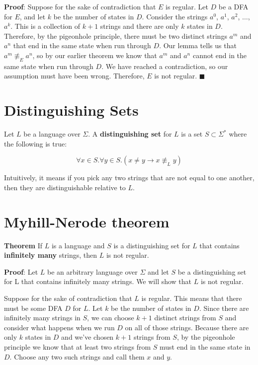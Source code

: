 \documentclass[12pt, letterpaper, oneside]{book}
\begin{document}
\textbf{Proof}: Suppose for the sake of contradiction that $E$ is regular. Let $D$ be a DFA for $E$, and let $k$ be the
number of states in $D$. Consider the strings $a^0$, $a^1$, $a^2$, $\ldots$, $a^k$. This is a collection of $k+1$
strings and there are only $k$ states in $D$. Therefore, by the pigeonhole principle, there must be two distinct
strings $a^m$ and $a^n$ that end in the same state when run through $D$. Our lemma tells us that $a^m \not\equiv_E a^n$,
so by our earlier theorem we know that $a^m$ and $a^n$ cannot end in the same state when run through $D$. We have
reached a contradiction, so our assumption must have been wrong. Therefore, $E$ is not regular. $\blacksquare$

\section{Distinguishing Sets}

Let $L$ be a language over $\Sigma$. A \textbf{distinguishing set} for $L$ is a set $S \subset \Sigma^*$ where the
following is true:

\[ \forall x \in S. \forall y \in S. (x \neq y \rightarrow x \not\equiv_L y) \]

Intuitively, it means if you pick any two strings that are not equal to one another, then they are distinguishable
relative to $L$.

\section{Myhill-Nerode theorem}

\textbf{Theorem} If $L$ is a language and $S$ is a distinguishing set for $L$ that contains \textbf{infinitely many}
strings, then $L$ is not regular.

\textbf{Proof}: Let $L$ be an arbitrary language over $\Sigma$ and let $S$ be a distinguishing set for L that contains
infinitely many strings. We will show that $L$ is not regular.

Suppose for the sake of contradiction that $L$ is regular. This means that there must be some DFA $D$ for $L$. Let $k$
be the number of states in $D$. Since there are infinitely many strings in $S$, we can choose $k+1$ distinct strings
from $S$ and consider what happens when we run $D$ on all of those strings. Because there are only $k$ states in $D$
and we've chosen $k+1$ strings from $S$, by the pigeonhole principle we know that at least two strings from $S$ must
end in the same state in $D$. Choose any two such strings and call them $x$ and $y$.
\end{document}
